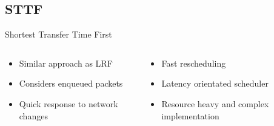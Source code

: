 \documentclass{beamer}
\begin{document}
\subsection{STTF}
\begin{frame}{Shortest Transfer Time First}
  \begin{columns}
    \begin{column}{0.48\textwidth}
      \begin{itemize}
        \setlength\itemsep{1.2em}
        \item Similar approach as LRF
        \item Considers enqueued packets
        \item Quick response to network changes
      \end{itemize}
    \end{column}


    \begin{column}{0.48\textwidth}
      \begin{itemize}
        \setlength\itemsep{1.2em}
        \item Fast rescheduling
        \item Latency orientated scheduler
        \item Resource heavy and complex implementation
      \end{itemize}
    \end{column}
  \end{columns}
\end{frame}

\end{document}
